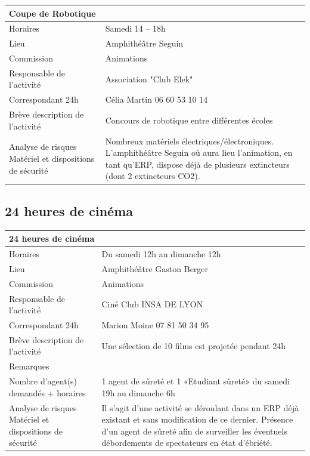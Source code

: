 \documentclass[hidelinks, paper=a4, fontsize=13pt]{report}
\begin{document}
\begin{center}
\begin{tabular}{ | p{6cm} | p{10cm} | }
\hline
	\multicolumn{2}{|l|}{Coupe de Robotique}  \\ \hline
	Horaires & Samedi 14 – 18h \\ \hline
	Lieu & Amphithéâtre Seguin \\ \hline
	Commission & Animations \\ \hline
	Responsable de l'activité & Association "Club Elek" \\ \hline
	Correspondant 24h & Célia Martin 06 60 53 10 14 \\ \hline
	Brève description de l'activité & Concours de robotique entre différentes écoles \\ \hline
	Analyse de risques
Matériel et dispositions de sécurité & Nombreux matériels électriques/électroniques.
L’amphithéâtre Seguin où aura lieu l’animation, en tant qu’ERP, dispose déjà de plusieurs extincteurs (dont 2 extincteurs CO2). \\ \hline
\end{tabular}
\end{center}

\subsection{24 heures de cinéma}

\begin{center}
\begin{tabular}{ | p{6cm} | p{10cm} | }
\hline
	\multicolumn{2}{|l|}{24 heures de cinéma}  \\ \hline
	Horaires & Du samedi 12h au dimanche 12h \\ \hline
	Lieu & Amphithéâtre Gaston Berger \\ \hline
	Commission & Animations \\ \hline
	Responsable de l'activité & Ciné Club INSA DE LYON \\ \hline
	Correspondant 24h & Marion Moine 07 81 50 34 95 \\ \hline
	Brève description de l'activité & Une sélection de 10 films est projetée pendant 24h \\ \hline
	Remarques &  \\ \hline
	Nombre d’agent(s) demandés + horaires
 & 1 agent de sûreté et 1 «Etudiant sûreté» du samedi 19h au dimanche 6h \\ \hline
	Analyse de risques
Matériel et dispositions de sécurité & Il s’agit d’une activité se déroulant dans un ERP déjà existant et sans modification de ce dernier.
Présence d’un agent de sûreté afin de surveiller les éventuels débordements de spectateurs en état d’ébriété. \\ \hline
\end{tabular}
\end{center}
\end{document}
